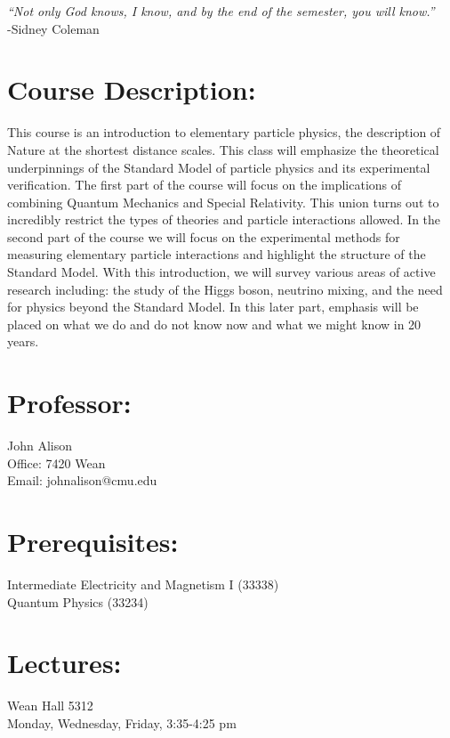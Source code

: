 \documentclass[margin,line]{res}
\begin{document}


\begin{resume}
{ \textit{\large``Not only God knows, I know, and by the end of the semester, you will know.''}\\ \hspace*{5in} -Sidney Coleman}

\section{Course Description:}
This course is an introduction to elementary particle physics, the description of Nature at the shortest distance scales. 
This class will emphasize the theoretical underpinnings of the Standard Model of particle physics and its experimental verification.
The first part of the course will focus on the implications of combining Quantum Mechanics and Special Relativity.
This union turns out to incredibly restrict the types of theories and particle interactions allowed.
In the second part of the course we will focus on the experimental methods for measuring elementary particle interactions and highlight the structure of the Standard Model.
With this introduction, we will survey various areas of active research including: the study of the Higgs boson, neutrino mixing, and the need for physics beyond the Standard Model. 
In this later part, emphasis will be placed on what we do and do not know now and what we might know in 20 years.


\section{Professor:}
John Alison\\
Office: 7420 Wean\\
Email: johnalison@cmu.edu

\section{Prerequisites:} 
Intermediate Electricity and Magnetism I (33338)\\
Quantum Physics (33234)

\section{Lectures:}
Wean Hall 5312\\ 
 Monday, Wednesday,  Friday, 3:35-4:25 pm 


\end{resume}
\end{document}

